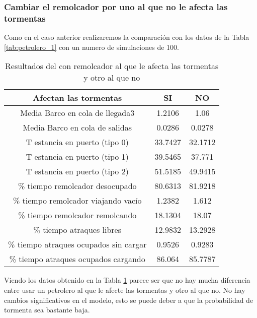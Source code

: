 \documentclass[12pt,a4paper]{article}
\begin{document}
\subsubsection{Cambiar el remolcador por uno al que no le afecta las tormentas}
Como en el caso anterior realizaremos la comparación con los datos de la Tabla \ref{tab:petrolero_1} con un numero de simulaciones de 100.
\begin{table}[h]
	\centering
	\begin{tabular}{c|cc}\toprule
		Afectan las tormentas&SI&NO\\\midrule
		Media Barco en cola de llegada3&1.2106&1.06\\
		Media Barco en cola de salidas&0.0286&0.0278\\
		T estancia en puerto (tipo 0)&33.7427&32.1712\\
		T estancia en puerto (tipo 1)&39.5465&37.771\\
		T estancia en puerto (tipo 2)&51.5185&49.9415\\
		\% tiempo remolcador desocupado&80.6313&81.9218\\
		\% tiempo remolcador viajando vacío&1.2382&1.612\\
		\% tiempo remolcador remolcando&18.1304&18.07\\
		\% tiempo atraques libres&12.9832&13.2928\\
		\% tiempo atraques ocupados sin cargar&0.9526&0.9283\\
		\% tiempo atraques ocupados cargando&86.064&85.7787\\
	\end{tabular}
	\caption{Resultados del con remolcador al que le afecta las tormentas y otro al que no} \label{tab:petrolero_3}
\end{table}
Viendo los datos obtenido en la Tabla \ref{tab:petrolero_3} parece ser que no hay mucha diferencia entre usar un petrolero al que le afecte las tormentas y otro al que no. No hay cambios significativos en el modelo, esto se puede deber a que la probabilidad de tormenta sea bastante baja.
\end{document}
